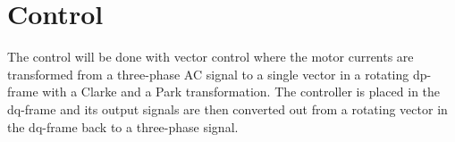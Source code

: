 \section{Control}
\label{sec:control}

The control will be done with vector control where the motor currents are transformed from a three-phase AC signal to a single vector in a rotating dp-frame with a Clarke and a Park transformation. The controller is placed in the dq-frame and its output signals are then converted out from a rotating vector in the dq-frame back to a three-phase signal.








